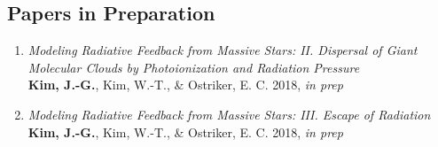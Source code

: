 \subsection{Papers in Preparation}
\begin{enumerate}
\item[] \textit{Modeling Radiative Feedback from Massive Stars: II.
    Dispersal of Giant Molecular Clouds by Photoionization and
    Radiation Pressure} \\
  \textbf{Kim, J.-G.}, Kim, W.-T., \& Ostriker, E. C. 2018, \textit{in
    prep}
\item[] \textit{Modeling Radiative Feedback from Massive Stars: III.
    Escape of Radiation} \\
  \textbf{Kim, J.-G.}, Kim, W.-T., \& Ostriker, E. C. 2018, \textit{in
    prep}
\end{enumerate}

